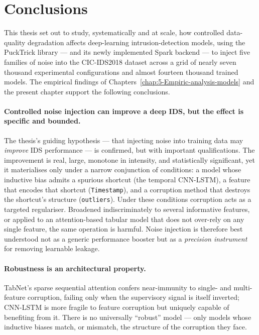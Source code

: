 \documentclass[../main.tex]{subfiles}
\begin{document}
\newpage
\section{Conclusions}
\label{sec:conclusions}

This thesis set out to study, systematically and at scale, how controlled data-quality degradation affects deep-learning intrusion-detection models, using the PuckTrick library --- and its newly implemented Spark backend --- to inject five families of noise into the CIC-IDS2018 dataset across a grid of nearly seven thousand experimental configurations and almost fourteen thousand trained models. The empirical findings of Chapters~\ref{chap:5-Empiric-analysis-models} and the present chapter support the following conclusions.

\paragraph{Controlled noise injection can improve a deep IDS, but the effect is specific and bounded.}
The thesis's guiding hypothesis --- that injecting noise into training data may \emph{improve} IDS performance --- is confirmed, but with important qualifications. The improvement is real, large, monotone in intensity, and statistically significant, yet it materialises only under a narrow conjunction of conditions: a model whose inductive bias admits a spurious shortcut (the temporal CNN-LSTM), a feature that encodes that shortcut (\texttt{Timestamp}), and a corruption method that destroys the shortcut's structure (\texttt{outliers}). Under these conditions corruption acts as a targeted regulariser. Broadened indiscriminately to several informative features, or applied to an attention-based tabular model that does not over-rely on any single feature, the same operation is harmful. Noise injection is therefore best understood not as a generic performance booster but as a \emph{precision instrument} for removing learnable leakage.

\paragraph{Robustness is an architectural property.}
TabNet's sparse sequential attention confers near-immunity to single- and multi-feature corruption, failing only when the supervisory signal is itself inverted; CNN-LSTM is more fragile to feature corruption but uniquely capable of benefiting from it. There is no universally ``robust'' model --- only models whose inductive biases match, or mismatch, the structure of the corruption they face.
\end{document}
